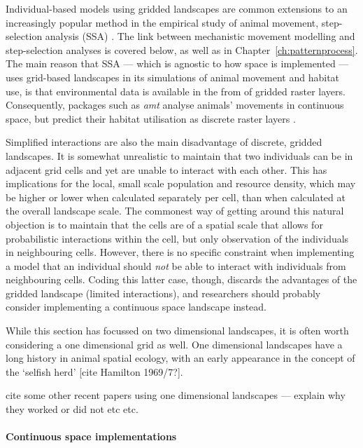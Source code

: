 Individual-based models using gridded landscapes are common extensions to an increasingly popular method in the empirical study of animal movement, step-selection analysis (SSA) \citep{fortin2005,avgar2016,fieberg2021}.
The link between mechanistic movement modelling and step-selection analyses is covered below, as well as in Chapter~\ref{ch:patternprocess}.
The main reason that SSA --- which is agnostic to how space is implemented --- uses grid-based landscapes in its simulations of animal movement and habitat use, is that environmental data is available in the from of gridded raster layers.
Consequently, packages such as \emph{amt} analyse animals' movements in continuous space, but predict their habitat utilisation as discrete raster layers \citep{signer2017,signer2019}.

Simplified interactions are also the main disadvantage of discrete, gridded landscapes.
It is somewhat unrealistic to maintain that two individuals can be in adjacent grid cells and yet are unable to interact with each other.
This has implications for the local, small scale population and resource density, which may be higher or lower when calculated separately per cell, than when calculated at the overall landscape scale.
The commonest way of getting around this natural objection is to maintain that the cells are of a spatial scale that allows for probabilistic interactions within the cell, but only observation of the individuals in neighbouring cells.
However, there is no specific constraint when implementing a model that an individual should \emph{not} be able to interact with individuals from neighbouring cells.
Coding this latter case, though, discards the advantages of the gridded landscape (limited interactions), and researchers should probably consider implementing a continuous space landscape instead.

While this section has focussed on two dimensional landscapes, it is often worth considering a one dimensional grid as well.
One dimensional landscapes have a long history in animal spatial ecology, with an early appearance in the concept of the `selfish herd' [cite Hamilton 1969/7?].

cite some other recent papers using one dimensional landscapes --- explain why they worked or did not etc etc.

\paragraph*{Continuous space implementations}

